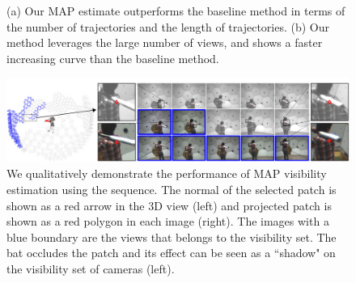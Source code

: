 \begin{figure}[t]
	\centering       
	\caption{(a) Our MAP estimate outperforms the baseline method in terms of the number of trajectories and the length of trajectories. (b) Our method leverages the large number of views, and shows a faster increasing curve than the baseline method.} 
	\label{Fig:quantitative}
\end{figure}

\begin{figure}[th]
	\centering       
	\includegraphics[width=\textwidth]{figures/VisibilityQualitativeFull_small2}
	\caption{We qualitatively demonstrate the performance of MAP visibility estimation using the  sequence. The normal of the selected patch is shown as a red arrow in the 3D view (left) and projected patch is shown as a red polygon in each image (right). The images with a blue boundary are the views that belongs to the visibility set. The bat occludes the patch and its effect can be seen as a ``shadow" on the visibility set of cameras (left).}
	\label{Fig:VisQ}
\end{figure}



